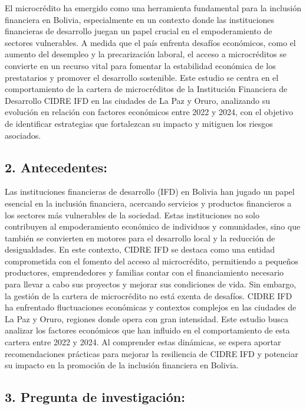 \documentclass[Royal,times,sageh]{sagej}
\begin{document}
El microcrédito ha emergido como una herramienta fundamental para la
inclusión financiera en Bolivia, especialmente en un contexto donde las
instituciones financieras de desarrollo juegan un papel crucial en el
empoderamiento de sectores vulnerables. A medida que el país enfrenta
desafíos económicos, como el aumento del desempleo y la precarización
laboral, el acceso a microcréditos se convierte en un recurso vital para
fomentar la estabilidad económica de los prestatarios y promover el
desarrollo sostenible. Este estudio se centra en el comportamiento de la
cartera de microcréditos de la Institución Financiera de Desarrollo
CIDRE IFD en las ciudades de La Paz y Oruro, analizando su evolución en
relación con factores económicos entre 2022 y 2024, con el objetivo de
identificar estrategias que fortalezcan su impacto y mitiguen los
riesgos asociados.

\subsection{\texorpdfstring{2.
\textbf{Antecedentes:}}{2. Antecedentes:}}\label{antecedentes}

Las instituciones financieras de desarrollo (IFD) en Bolivia han jugado
un papel esencial en la inclusión financiera, acercando servicios y
productos financieros a los sectores más vulnerables de la sociedad.
Estas instituciones no solo contribuyen al empoderamiento económico de
individuos y comunidades, sino que también se convierten en motores para
el desarrollo local y la reducción de desigualdades. En este contexto,
CIDRE IFD se destaca como una entidad comprometida con el fomento del
acceso al microcrédito, permitiendo a pequeños productores,
emprendedores y familias contar con el financiamiento necesario para
llevar a cabo sus proyectos y mejorar sus condiciones de vida. Sin
embargo, la gestión de la cartera de microcrédito no está exenta de
desafíos. CIDRE IFD ha enfrentado fluctuaciones económicas y contextos
complejos en las ciudades de La Paz y Oruro, regiones donde opera con
gran intensidad. Este estudio busca analizar los factores económicos que
han influido en el comportamiento de esta cartera entre 2022 y 2024. Al
comprender estas dinámicas, se espera aportar recomendaciones prácticas
para mejorar la resiliencia de CIDRE IFD y potenciar su impacto en la
promoción de la inclusión financiera en Bolivia.

\subsection{\texorpdfstring{3. \textbf{Pregunta de
investigación:}}{3. Pregunta de investigación:}}\label{pregunta-de-investigaciuxf3n}
\end{document}
